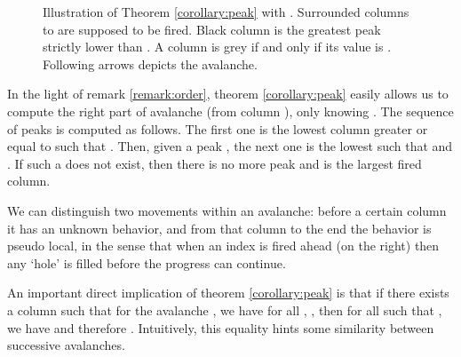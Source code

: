 \documentclass[11pt,a4paper]{llncs}
\begin{document}
\begin{figure}
\caption{Illustration of Theorem \ref{corollary:peak} with . Surrounded columns  to  are supposed to be fired. Black column is the greatest peak strictly lower than . A column is grey if and only if its value is . Following arrows depicts the avalanche.}
\label{fig:peak}
\end{figure}

  In the light of remark \ref{remark:order}, theorem \ref{corollary:peak} easily allows us to compute the right part of  avalanche (from column ), only knowing . The sequence of peaks is computed as follows. The first one is the lowest column  greater or equal to  such that . Then, given a peak , the next one is the lowest   such that   and . If such a  does not exist, then there is no more peak and  is the largest fired column.

  We can distinguish two movements within an avalanche: before a certain column it has an unknown behavior, and from that column to the end the behavior is pseudo local, in the sense that when an index is fired ahead (on the right) then any `hole' is filled before the progress can continue.

An important direct implication of theorem \ref{corollary:peak} is that if there exists a column  such that for the  avalanche , we have for all , , then for all  such that , we have  and therefore . Intuitively, this equality hints some similarity between successive avalanches.
\end{document}
